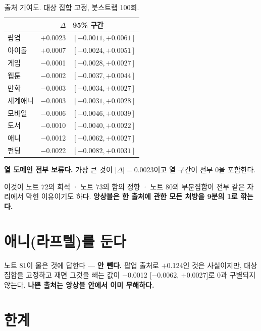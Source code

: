 \documentclass[10pt]{article}
\begin{document}
\begin{table}[t]
\centering\tsize
\caption{출처 기여도. 대상 집합 고정, 붓스트랩 100회.}
\begin{tabular}{lrl}
\toprule
& $\Delta$ & 95\% 구간 \\
\midrule
팝업 & $+$0.0023 & $[-0.0011, +0.0061]$ \\
아이돌 & $+$0.0007 & $[-0.0024, +0.0051]$ \\
게임 & $-$0.0001 & $[-0.0028, +0.0027]$ \\
웹툰 & $-$0.0002 & $[-0.0037, +0.0044]$ \\
만화 & $-$0.0003 & $[-0.0034, +0.0027]$ \\
세계애니 & $-$0.0003 & $[-0.0031, +0.0028]$ \\
모바일 & $-$0.0006 & $[-0.0046, +0.0039]$ \\
도서 & $-$0.0010 & $[-0.0040, +0.0022]$ \\
애니 & $-$0.0012 & $[-0.0062, +0.0027]$ \\
펀딩 & $-$0.0022 & $[-0.0082, +0.0031]$ \\
\bottomrule
\end{tabular}
\end{table}

\textbf{열 도메인 전부 보류다.} 가장 큰 것이 $|\Delta|=$0.0023이고 열 구간이
전부 0을 포함한다.


이것이 노트 72의 희석 · 노트 73의 합의 정향 · 노트 80의 부분집합이 전부 같은
자리에서 막힌 이유이기도 하다. \textbf{앙상블은 한 출처에 관한 모든 처방을
9분의 1로 깎는다.}

\section{애니(라프텔)를 둔다}

노트 81이 물은 것에 답한다 --- \textbf{안 뺀다.} 팝업 출처로 $+$0.124인 것은
사실이지만, 대상 집합을 고정하고 재면 그것을 빼는 값이 $-$0.0012
$[-$0.0062, $+$0.0027$]$로 0과 구별되지 않는다. \textbf{나쁜 출처는 앙상블
안에서 이미 무해하다.}

\section{한계}
\end{document}

